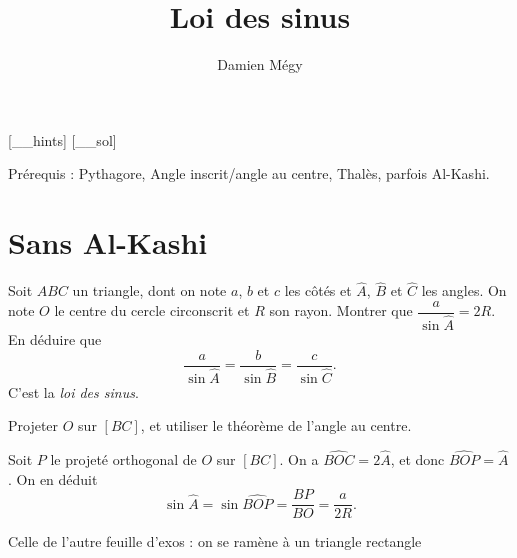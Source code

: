 





[_\jobname_hints]
[_\jobname_sol]


\title{Loi des sinus}
\author{Damien Mégy}
\maketitle

Prérequis : Pythagore, Angle inscrit/angle au centre, Thalès, parfois Al-Kashi.

\section{Sans Al-Kashi}

\begin{exo}
Soit $ABC$ un triangle, dont on note $a$, $b$ et $c$ les côtés et $\widehat A$, $\widehat B$ et $\widehat C$ les angles.
On note $O$ le centre du cercle  circonscrit et $R$ son rayon.
Montrer que $\dfrac{a}{\sin \widehat A} = 2R$.
En déduire que
\[ \frac{a}{\sin \widehat A} = \frac{b}{\sin \widehat B}  = \frac{c}{\sin \widehat C}.\]
C'est la \emph{loi des sinus}.
\begin{hint}
Projeter $O$ sur $[BC]$, et utiliser le théorème de l'angle au centre.
\end{hint}
\begin{sol}
Soit $P$ le projeté orthogonal de $O$ sur $[BC]$.
On a $\widehat{BOC} = 2\widehat{A}$, et donc $\widehat{BOP}=\widehat A$.
On en déduit 
\[ \sin \widehat A = \sin \widehat{BOP}
= \frac{BP}{BO} = \frac{a}{2R}.\]
\end{sol}
\end{exo}


\begin{exo}
Celle de l'autre feuille d'exos : on se ramène à un triangle rectangle
\begin{hint}
\end{hint}
\begin{sol}
\end{sol}
\end{exo}

\begin{exo}
\begin{hint}
\end{hint}
\begin{sol}
\end{sol}
\end{exo}

